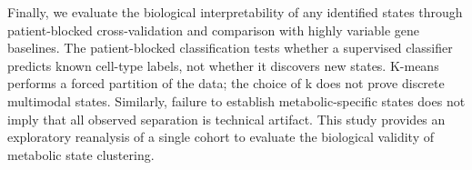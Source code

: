 Finally, we evaluate the biological interpretability of any identified states through patient-blocked cross-validation and comparison with highly variable gene baselines. The patient-blocked classification tests whether a supervised classifier predicts known cell-type labels, not whether it discovers new states. K-means performs a forced partition of the data; the choice of k does not prove discrete multimodal states. Similarly, failure to establish metabolic-specific states does not imply that all observed separation is technical artifact. This study provides an exploratory reanalysis of a single cohort to evaluate the biological validity of metabolic state clustering.
